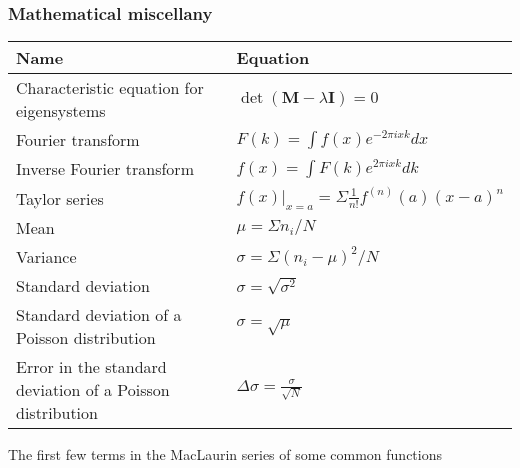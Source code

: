 \documentclass[11pt]{paper}
\begin{document}
\newpage

\subsubsection*{Mathematical miscellany}
\label{subsec:misc}
\centering
\label{my-label}
\bgroup
\def\arraystretch{2}
\begin{longtable}{ll}
\textbf{Name}       & \textbf{Equation}          \\ \hline
\multicolumn{1}{|l|}{Characteristic equation for eigensystems} & \multicolumn{1}{l|}{$\det\left(\mathbf{M}-\lambda\mathbf{I}\right)=0$} \\ \hline
\multicolumn{1}{|l|}{Fourier transform} & \multicolumn{1}{l|}{$F(k) = \int f(x)e^{-2\pi i x k} dx$} \\ \hline
\multicolumn{1}{|l|}{Inverse Fourier transform} & \multicolumn{1}{l|}{$f(x) = \int F(k)e^{2\pi i x k} dk$} \\ \hline
\multicolumn{1}{|l|}{Taylor series} & \multicolumn{1}{l|}{$f(x)|_{x=a} = \Sigma \frac{1}{n!}f^{(n)}(a)(x-a)^n$} \\ \hline
\multicolumn{1}{|l|}{Mean} & \multicolumn{1}{l|}{$\mu = \Sigma n_i / N$} \\ \hline
\multicolumn{1}{|l|}{Variance} & \multicolumn{1}{l|}{$\sigma = \Sigma(n_i - \mu)^2/N$} \\ \hline
\multicolumn{1}{|l|}{Standard deviation} & \multicolumn{1}{l|}{$\sigma = \sqrt{\sigma^2}$} \\ \hline
\multicolumn{1}{|l|}{Standard deviation of a Poisson distribution} & \multicolumn{1}{l|}{$\sigma = \sqrt{\mu}$} \\ \hline
\multicolumn{1}{|l|}{Error in the standard deviation of a Poisson distribution} & \multicolumn{1}{l|}{$\Delta\sigma = \frac{\sigma}{\sqrt{N}}$} \\ \hline
\end{longtable}
\label{my-label}
\bgroup
The first few terms in the MacLaurin series of some common functions
\def\arraystretch{2}
\end{document}
